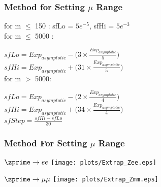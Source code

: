 \begin{frame}
	\frametitle{Method for Setting $\mu$ Range}
	
	\vspace{10pt}
	
	
	
	\vspace{5pt}
	{\scriptsize{
	
	
	for m $\leqslant$ 150 : sfLo = $5e^{-5}$, sfHi = $5e^{-3}$\\
	\vspace{5pt}
	for m $\leqslant$ 5000 :
	
	\hspace{20pt}    $sfLo = Exp_{asymptotic} - \bigg( 3 \times \frac{Exp_{asymptotic}}{5} \bigg)$ \\
	\hspace{20pt}    $sfHi = Exp_{asymptotic} + \bigg( 31 \times \frac{Exp_{asymptotic}}{5} \bigg)$\\
  	\vspace{5pt}
	for m $>$ 5000: 
	
	
	\hspace{20pt}    $sfLo = Exp_{asymptotic} - \bigg( 2 \times \frac{Exp_{asymptotic}}{4} \bigg)$ \\
    \hspace{20pt}   $sfHi = Exp_{asymptotic} + \bigg( 34 \times \frac{Exp_{asymptotic}}{4} \bigg)$\\
   
	$sfStep = \frac{sfHi-sfLo}{30}$
	
	}}
	
	\cend

	\vspace{5pt}
	
\end{frame}



\begin{frame}
	\frametitle{Method For Setting $\mu$ Range}
	
		\begin{center}
		$\zprime \rightarrow ee$
		\texttt{[image: plots/Extrap\_Zee.eps]}
		\end{center}
		\begin{center}
		$\zprime \rightarrow \mu\mu$
		\texttt{[image: plots/Extrap\_Zmm.eps]}
		\end{center}
	\cend
\end{frame}


